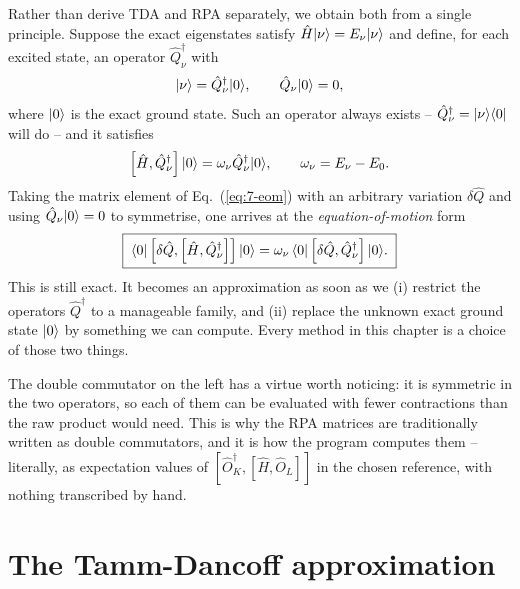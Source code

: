 Rather than derive TDA and RPA separately, we obtain both from a single
principle.  Suppose the exact eigenstates satisfy
$\hat{H}\vert \nu \rangle=E_{\nu}\vert \nu \rangle$ and define, for each excited state, an
operator $\hat{Q}^{\dagger}_{\nu}$ with
\begin{equation}
  \vert \nu \rangle = \hat{Q}^{\dagger}_{\nu}\vert 0 \rangle,
  \qquad
  \hat{Q}_{\nu}\vert 0 \rangle = 0,
  \label{eq:7-phonon}
\end{equation}
where $\vert 0 \rangle$ is the exact ground state.  Such an operator always exists --
$\hat{Q}^{\dagger}_{\nu}=\vert \nu \rangle\langle 0 \vert$ will do -- and it satisfies
\begin{equation}
  \left[\hat{H},\hat{Q}^{\dagger}_{\nu}\right]\vert 0 \rangle
   = \omega_{\nu}\hat{Q}^{\dagger}_{\nu}\vert 0 \rangle,
  \qquad
  \omega_{\nu} = E_{\nu}-E_0 .
  \label{eq:7-eom}
\end{equation}
Taking the matrix element of Eq.~(\ref{eq:7-eom}) with an arbitrary variation
$\delta\hat{Q}$ and using $\hat{Q}_{\nu}\vert 0 \rangle=0$ to symmetrise, one arrives
at the \emph{equation-of-motion} form
\begin{equation}
  \boxed{\;
  \langle 0 | \left[\delta\hat{Q},\left[\hat{H},
    \hat{Q}^{\dagger}_{\nu}\right]\right] | 0 \rangle
   = \omega_{\nu}\,
     \langle 0 | \left[\delta\hat{Q},
       \hat{Q}^{\dagger}_{\nu}\right] | 0 \rangle .
  \;}
  \label{eq:7-eomdouble}
\end{equation}
This is still exact.  It becomes an approximation as soon as we (i) restrict
the operators $\hat{Q}^{\dagger}$ to a manageable family, and (ii) replace the
unknown exact ground state $\vert 0 \rangle$ by something we can compute.  Every
method in this chapter is a choice of those two things.

The double commutator on the left has a virtue worth noticing: it is
symmetric in the two operators, so each of them can be evaluated with fewer
contractions than the raw product would need.  This is why the RPA matrices
are traditionally written as double commutators, and it is how the program
computes them -- literally, as expectation values of
$[\hat{O}^{\dagger}_K,[\hat{H},\hat{O}_L]]$ in the chosen reference, with
nothing transcribed by hand.

\section{The Tamm-Dancoff approximation}
\label{sec:tda}

